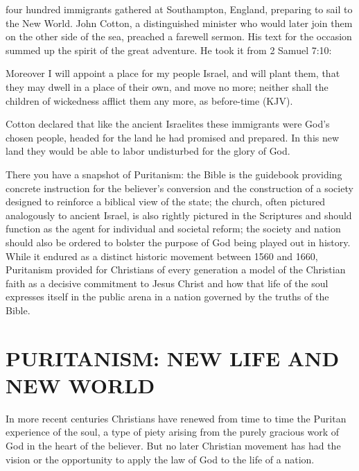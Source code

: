 
 four hundred immigrants gathered at Southampton, England, preparing to
sail to the New World. John Cotton, a distinguished minister who would later join them on the other
side of the sea, preached a farewell sermon. His text for the occasion summed up the spirit of the
great adventure. He took it from 2 Samuel 7:10:

\begin{blockquote}
Moreover I will appoint a place for my people Israel, and will plant them, that they may dwell in a
place of their own, and move no more; neither shall the children of wickedness afflict them any
more, as before-time (KJV).
\end{blockquote}

Cotton declared that like the ancient Israelites these immigrants were God’s chosen people, headed
for the land he had promised and prepared. In this new land they would be able to labor undisturbed
for the glory of God.

There you have a snapshot of Puritanism: the Bible is the guidebook providing concrete instruction
for the believer’s conversion and the construction of a society designed to reinforce a biblical
view of the state; the church, often pictured analogously to ancient Israel, is also rightly
pictured in the Scriptures and should function as the agent for individual and societal reform; the
society and nation should also be ordered to bolster the purpose of God being played out in history.
While it endured as a distinct historic movement between 1560 and 1660, Puritanism provided for
Christians of every generation a model of the Christian faith as a decisive commitment to Jesus
Christ and how that life of the soul expresses itself in the public arena in a nation governed by
the truths of the Bible.

\section{PURITANISM: NEW LIFE AND NEW WORLD}

In more recent centuries Christians have renewed from time to time the Puritan experience of the
soul, a type of piety arising from the purely gracious work of God in the heart of the believer. But
no later Christian movement has had the vision or the opportunity to apply the law of God to the
life of a nation.

